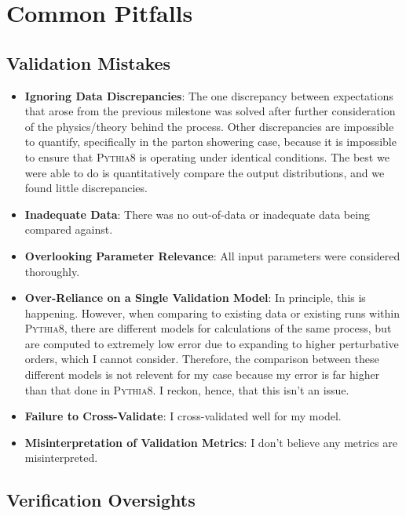 \section{Common Pitfalls}


\subsection{Validation Mistakes}

\begin{itemize}
\item \textbf{Ignoring Data Discrepancies}: The one discrepancy between expectations that arose from the previous milestone was solved after further consideration of the physics/theory behind the process. Other discrepancies are impossible to quantify, specifically in the parton showering case, because it is impossible to ensure that \textsc{Pythia8} is operating under identical conditions. The best we were able to do is quantitatively compare the output distributions, and we found little discrepancies.
\item \textbf{Inadequate Data}: There was no out-of-data or inadequate data being compared against.
\item \textbf{Overlooking Parameter Relevance}: All input parameters were considered thoroughly.
\item \textbf{Over-Reliance on a Single Validation Model}: In principle, this is happening. However, when comparing to existing data or existing runs within \textsc{Pythia8}, there are different models for calculations of the same process, but are computed to extremely low error due to expanding to higher perturbative orders, which I cannot consider. Therefore, the comparison between these different models is not relevent for my case because my error is far higher than that done in \textsc{Pythia8}. I reckon, hence, that this isn't an issue.
\item \textbf{Failure to Cross-Validate}: I cross-validated well for my model.
\item \textbf{Misinterpretation of Validation Metrics}: I don't believe any metrics are misinterpreted.
\end{itemize}


\subsection{Verification Oversights}

